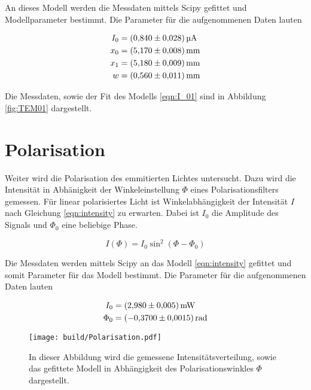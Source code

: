 An dieses Modell werden die Messdaten mittels Scipy \cite{scipy} gefittet und Modellparameter bestimmt. Die Parameter für die aufgenommenen Daten lauten 

\begin{align*}
    I_0 &= \qty{0.84 +- 0.028}{\micro\ampere}\\
    x_0 &= \qty{5.17 +- 0.008}{\milli\metre}\\
    x_1 &= \qty{5.18 +- 0.009}{\milli\metre}\\
    w   &= \qty{0.56 +- 0.011}{\milli\metre}\\
\end{align*}

Die Messdaten, sowie der Fit des Modells \ref{eqn:I_01} sind in Abbildung \ref{fig:TEM01} dargestellt.



\section{Polarisation}
\label{sec:Polarisation}
Weiter wird die Polarisation des emmitierten Lichtes untersucht. Dazu wird die Intensität in Abhänigkeit der Winkeleinstellung $\Phi$ eines Polarisationsfilters gemessen. 
Für linear polarisiertes Licht ist Winkelabhängigkeit der Intensität $I$ nach Gleichung \ref{eqn:intensity} zu erwarten. Dabei ist $I_0$ die Amplitude des Signals und $\Phi_0$ 
eine beliebige Phase.

\begin{equation}
    \label{eqn:intensity}
    I(\Phi) = I_0 \sin^2(\Phi - \Phi_0)
\end{equation}

Die Messdaten werden mittels Scipy \cite{scipy} an das Modell \ref{eqn:intensity} gefittet und somit Parameter für das Modell bestimmt. Die Parameter für die aufgenommenen Daten lauten 

\begin{align*}
    I_0 &= \qty{2.98 +- 0.005}{\milli\watt}\\
    \Phi_0 &= \qty{-0.37 +- 0.0015}{rad}\\
\end{align*}

\begin{figure}
    \centering
    \texttt{[image: build/Polarisation.pdf]}
    \caption{In dieser Abbildung wird die gemessene Intensitätsverteilung, sowie das gefittete Modell in Abhängigkeit des Polarisationswinkles $\Phi$ dargestellt.}
    \label{fig:Polarisation}
\end{figure}

